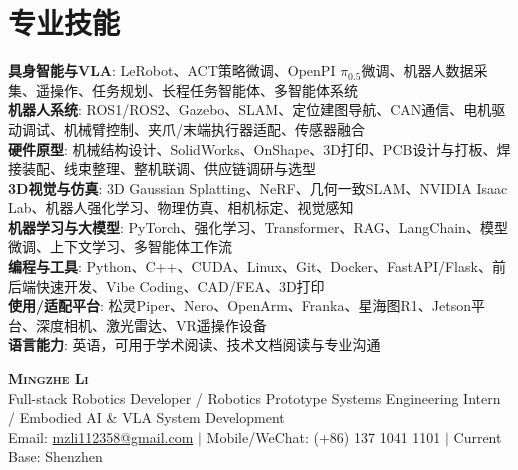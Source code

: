 \documentclass[letterpaper,12pt]{article}
\begin{document}
\section{专业技能}
 \begin{itemize}[leftmargin=0.15in, label={}]
    \small{\item{
     \textbf{具身智能与VLA}{: LeRobot、ACT策略微调、OpenPI $\pi_{0.5}$微调、机器人数据采集、遥操作、任务规划、长程任务智能体、多智能体系统} \\
     \textbf{机器人系统}{: ROS1/ROS2、Gazebo、SLAM、定位建图导航、CAN通信、电机驱动调试、机械臂控制、夹爪/末端执行器适配、传感器融合} \\
     \textbf{硬件原型}{: 机械结构设计、SolidWorks、OnShape、3D打印、PCB设计与打板、焊接装配、线束整理、整机联调、供应链调研与选型} \\
     \textbf{3D视觉与仿真}{: 3D Gaussian Splatting、NeRF、几何一致SLAM、NVIDIA Isaac Lab、机器人强化学习、物理仿真、相机标定、视觉感知} \\
     \textbf{机器学习与大模型}{: PyTorch、强化学习、Transformer、RAG、LangChain、模型微调、上下文学习、多智能体工作流} \\
     \textbf{编程与工具}{: Python、C++、CUDA、Linux、Git、Docker、FastAPI/Flask、前后端快速开发、Vibe Coding、CAD/FEA、3D打印} \\
     \textbf{使用/适配平台}{: 松灵Piper、Nero、OpenArm、Franka、星海图R1、Jetson平台、深度相机、激光雷达、VR遥操作设备} \\
     \textbf{语言能力}{: 英语，可用于学术阅读、技术文档阅读与专业沟通} \\
    }}
 \end{itemize}



\newpage


\begin{center}
    \textbf{\Huge \scshape Mingzhe Li} \\ \vspace{5pt}
    \small Full-stack Robotics Developer / Robotics Prototype Systems Engineering Intern / Embodied AI \& VLA System Development \\ \vspace{3pt}
    \small Email: \href{mailto:mzli112358@gmail.com}{mzli112358@gmail.com} $|$ Mobile/WeChat: (+86) 137 1041 1101 $|$ Current Base: Shenzhen \\
\end{center}
\end{document}

